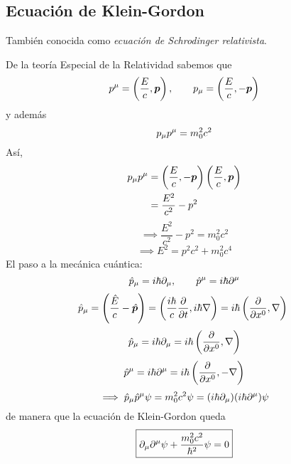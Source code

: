 \subsection{Ecuación de Klein-Gordon}
También conocida como \textit{ecuación de Schrodinger relativista}. 

De la teoría Especial de la Relatividad sabemos que
\begin{equation}
  p^\mu =\left(\frac{E}{c},\vb*{p}\right),\qquad p_\mu =\left(\frac{E}{c},-\vb*{p}\right)
\end{equation}
y además
\begin{equation}
  p_\mu p^\mu =m_0^2c^2
\end{equation}
Así,
\begin{align}
  p_\mu p^\mu &=\left(\frac{E}{c},-\vb*{p}\right)\left(\frac{E}{c},\vb*{p}\right)\\
  &=\frac{E^2}{c^2}-p^2
\end{align}
\begin{equation}
  \implies \frac{E^2}{c^2}-p^2=m_0^2c^2
\end{equation}
\begin{equation}\label{21.E2}
  \implies \boxed{E^2=p^2c^2+m_0^2c^4}
\end{equation}
El paso a la mecánica cuántica:
\begin{equation}
  \hat{p}_\mu =i\hbar \partial_\mu ,\qquad \hat{p}^\mu =i\hbar\partial^\mu 
\end{equation}
\begin{align}
  \hat{p}_\mu =\left(\frac{\hat{E}}{c}-\hat{\vb*{p}}\right)=\left(\frac{i\hbar}{c}\pdv{t},i\hbar\nabla\right)=i\hbar\left(\pdv{x^0},\nabla \right)\
\end{align}
\begin{equation}
  \hat{p}_\mu =i\hbar\partial_\mu =i\hbar\left(\pdv{x^0},\nabla \right)
\end{equation}
\begin{equation}
  \hat{p}^\mu =i\hbar\partial^\mu =i\hbar\left(\pdv{x^0},-\nabla \right)
\end{equation}
\begin{equation}
  \implies \hat{p}_\mu \hat{p}^\mu \psi =m_0^2c^2\psi=(i\hbar\partial_\mu )(i\hbar\partial^\mu )\psi 
\end{equation}
de manera que la ecuación de Klein-Gordon queda
\begin{equation}\label{21.KG}
  \boxed{\partial_\mu \partial^\mu \psi+\frac{m_0^2c^2}{\hbar^2}\psi=0}
\end{equation}

